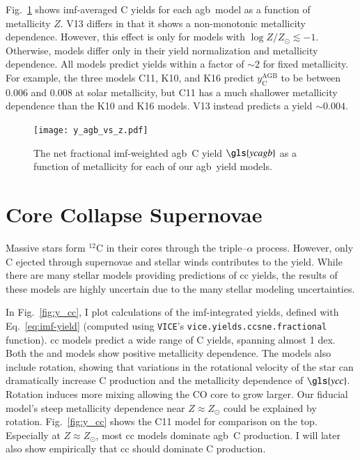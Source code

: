 \documentclass[12pt,oneside,letterpaper]{report}
\newcommand{\cc}{\gls{cc}}
\newcommand{\agb}{\gls{agb}}
\newcommand{\imf}{\gls{imf}}
\newcommand{\Ycc}{\gls{ycc}}
\newcommand{\Ycagb}{\gls{ycagb}}
\newcommand{\VICE}{\texttt{VICE}}
\newcommand{\about}[1]{${\sim} #1$}
\begin{document}
Fig.~\ref{fig:yagb-z} shows \imf-averaged C yields for each \agb\ model as a function of metallicity $Z$.
V13 differs in that it shows a non-monotonic metallicity dependence. However, this effect is only for models with $\log Z/Z_\odot \lesssim -1$.
Otherwise, models differ only in their yield normalization and metallicity dependence. All models predict yields within a factor of \about{2} for fixed metallicity.
For example, the three models C11, K10, and K16 predict $y_\text{C}^\text{AGB}$ to be between 0.006 and 0.008 at solar metallicity, but C11 has a much shallower metallicity dependence than the K10 and K16 models. V13 instead predicts a yield \about{0.004}.

\begin{figure}
    \centering
    \texttt{[image: y\_agb\_vs\_z.pdf]}

    \caption[Low mass yield metallicity dependence]{The net fractional \imf-weighted \agb\ C yield $\Ycagb$ as a function of metallicity for each of our \agb\ yield models.
    }
    \label{fig:yagb-z}
\end{figure}

\section{Core Collapse Supernovae}


Massive stars form $^{12}$C in their cores through the triple--$\alpha$ process. However, only C ejected through supernovae and stellar winds contributes to the yield. 
While there are many stellar models providing predictions of \cc{} yields, the results of these models are highly uncertain due to the many stellar modeling uncertainties. 

In Fig.~\ref{fig:y_cc}, I plot calculations of the \imf-integrated yields, defined with Eq.~\ref{eq:imf-yield} (computed using \VICE's \texttt{vice.yields.ccsne.fractional} function). 
\cc{} models predict a wide range of C yields, spanning almost 1 dex. 
Both the \citet{NKT13} and \cite{LC18} models show positive metallicity dependence. 
The \cite{LC18} models also include rotation, showing that variations in the rotational velocity of the star can dramatically increase C production and the metallicity dependence of $\Ycc$. Rotation induces more mixing allowing the CO core to grow larger. Our fiducial model's steep metallicity dependence near $Z\approx Z_\odot$ could be explained by rotation. 
Fig.~\ref{fig:y_cc} shows the C11 model for comparison on the top. Especially at $Z\approx Z_\odot$, most \cc{} models dominate \agb\ C production. I will later also show empirically that \cc{} should dominate C production. 
\end{document}
